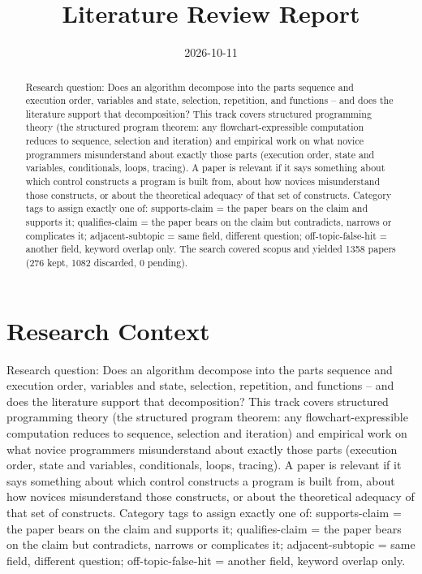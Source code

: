 \documentclass{article}
\title{Literature Review Report}
\date{2026-10-11}
\begin{document}
\maketitle

\begin{abstract}
Research question: Does an algorithm decompose into the parts sequence and execution order, variables and state, selection, repetition, and functions -- and does the literature support that decomposition? This track covers structured programming theory (the structured program theorem: any flowchart-expressible computation reduces to sequence, selection and iteration) and empirical work on what novice programmers misunderstand about exactly those parts (execution order, state and variables, conditionals, loops, tracing). A paper is relevant if it says something about which control constructs a program is built from, about how novices misunderstand those constructs, or about the theoretical adequacy of that set of constructs. Category tags to assign exactly one of: supports-claim = the paper bears on the claim and supports it; qualifies-claim = the paper bears on the claim but contradicts, narrows or complicates it; adjacent-subtopic = same field, different question; off-topic-false-hit = another field, keyword overlap only. The search covered scopus and yielded 1358 papers (276 kept, 1082 discarded, 0 pending).
\end{abstract}
\clearpage
\clearpage
\tableofcontents
\clearpage

\section{Research Context}
Research question: Does an algorithm decompose into the parts sequence
and execution order, variables and state, selection, repetition, and
functions -- and does the literature support that decomposition? This
track covers structured programming theory (the structured program
theorem: any flowchart-expressible computation reduces to sequence,
selection and iteration) and empirical work on what novice programmers
misunderstand about exactly those parts (execution order, state and
variables, conditionals, loops, tracing). A paper is relevant if it says
something about which control constructs a program is built from, about
how novices misunderstand those constructs, or about the theoretical
adequacy of that set of constructs. Category tags to assign exactly one
of: supports-claim = the paper bears on the claim and supports it;
qualifies-claim = the paper bears on the claim but contradicts, narrows
or complicates it; adjacent-subtopic = same field, different question;
off-topic-false-hit = another field, keyword overlap only.
\end{document}
